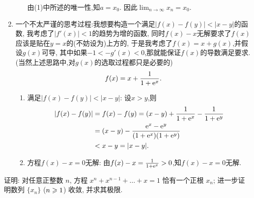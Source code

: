 \begin{solution}
\begin{enumerate}
\begin{enumerate}
                        由(1)中所述的唯一性,知$a = x_0$. 因此$\lim_{n \to \infty} x_n = x_0$.
              \end{enumerate}
        \item 一个不太严谨的思考过程:我想要构造一个满足$|f(x)-f(y)| < |x-y|$的函数, 我考虑了$|f'(x)|<1$的趋势为增的函数, 同时$f(x)-x$无解要求了$f(x)$应该是贴在$y=x$的(不妨设为)上方的, 于是我考虑了$f(x) = x + g(x)$,并假设$g(x)$可导, 其中如果$-1 < -g'(x) < 0$,那就能保证$f(x)$的导数满足要求.(当然上述思路中,对$g(x)$的选取过程都只是必要的)
              $$f(x) = x + \frac{1}{1 + \mathrm{e}^{x}}.$$
              \begin{enumerate}
                  \item 满足$|f(x)-f(y)| < |x-y|$:
                        设$x > y$,则
                        \begin{align*}
                            |f(x)-f(y)| & = f(x)-f(y) = (x-y) + \frac{1}{1+\mathrm{e}^x} - \frac{1}{1+\mathrm{e}^y} \\
                                        & = (x-y) - \frac{\mathrm{e}^x - \mathrm{e}^y}{(1+\mathrm{e}^x)(1+\mathrm{e}^y)}            \\
                                        & < x-y = |x-y|.
                        \end{align*}
                  \item 方程$f(x)-x=0$无解:
                        由$f(x)-x = \frac{1}{1+\mathrm{e}^x} > 0$,知$f(x)-x=0$无解.
              \end{enumerate}
    \end{enumerate}
\end{solution}

\begin{exercise}[2.C.9]
    证明: 对任意正整数 $n$, 方程 $x^n+x^{n-1}+\dots+x=1$ 恰有一个正根 $x_n$; 进一步证明数列 $\{x_n\}$ ($n \geqslant 1$) 收敛, 并求其极限.
\end{exercise}

